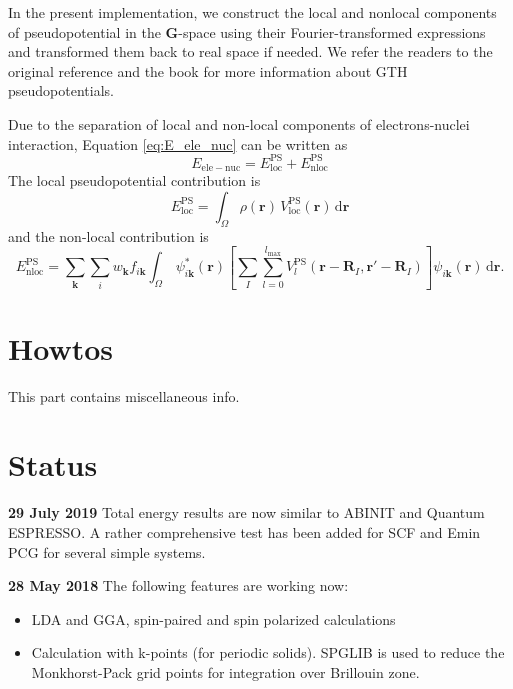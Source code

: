 \documentclass[a4paper,10pt]{article}
\begin{document}
In the present implementation, we construct the local and nonlocal
components of pseudopotential in the $\mathbf{G}$-space using
their Fourier-transformed expressions
and transformed them back to real space if needed.
We refer the readers to the original
reference \cite{Goedecker1996} and the book \cite{Marx2009}
for more information about GTH pseudopotentials.

Due to the separation of local and non-local components of electrons-nuclei
interaction, Equation \eqref{eq:E_ele_nuc} can be written as
\begin{equation}
E_{\mathrm{ele-nuc}} = E^{\mathrm{PS}}_{\mathrm{loc}}
+ E^{\mathrm{PS}}_{\mathrm{nloc}}
\end{equation}
%
The local pseudopotential contribution is
\begin{equation}
E^{\mathrm{PS}}_{\mathrm{loc}} =
\int_{\Omega} \rho(\mathbf{r})\,V^{\mathrm{PS}}_{\mathrm{loc}}(\mathbf{r})\,
\mathrm{d}\mathbf{r}
\end{equation}
%
and the non-local contribution is
\begin{equation}
E^{\mathrm{PS}}_{\mathrm{nloc}} =
\sum_{\mathbf{k}}
\sum_{i}
w_{\mathbf{k}}
f_{i\mathbf{k}}
\int_{\Omega}\,
\psi^{*}_{i\mathbf{k}}(\mathbf{r})
\left[
\sum_{I}\sum_{l=0}^{l_{\mathrm{max}}}
V^{\mathrm{PS}}_{l}(\mathbf{r}-\mathbf{R}_{I},\mathbf{r}'-\mathbf{R}_{I})
\right]
\psi_{i\mathbf{k}}(\mathbf{r})
\,\mathrm{d}\mathbf{r}.
\end{equation}


\appendix
\section{Howtos}

This part contains miscellaneous info.




\section*{Status}

\textbf{29 July 2019} Total energy results are now similar to ABINIT
and Quantum ESPRESSO. A rather comprehensive test has been added
for SCF and Emin PCG for several simple systems.


\textbf{28 May 2018} The following features are working now:
\begin{itemize}
\item LDA and GGA, spin-paired and spin polarized calculations
\item Calculation with k-points (for periodic solids).
  \textsf{SPGLIB} is used to reduce the Monkhorst-Pack grid points
  for integration over Brillouin zone.
\end{itemize}
\end{document}
